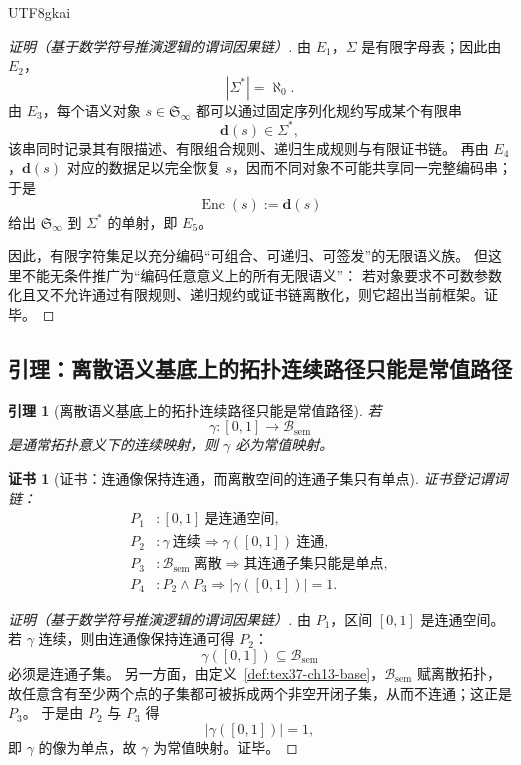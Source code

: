 \documentclass[12pt]{article}
\newtheorem{lemma}{引理}[section]
\newtheorem{Certificate}{证书}[section]
\begin{document}
\begin{CJK*}{UTF8}{gkai}
\begin{proof}[证明（基于数学符号推演逻辑的谓词因果链）]
由 $E_1$，$\Sigma$ 是有限字母表；因此由 $E_2$，
\[
  |\Sigma^\ast|=\aleph_0.
\]
由 $E_3$，每个语义对象 $s\in\mathfrak S_\infty$ 都可以通过固定序列化规约写成某个有限串
\[
  \mathbf d(s)\in \Sigma^\ast,
\]
该串同时记录其有限描述、有限组合规则、递归生成规则与有限证书链。
再由 $E_4$，$\mathbf d(s)$ 对应的数据足以完全恢复 $s$，因而不同对象不可能共享同一完整编码串；
于是
\[
  \operatorname{Enc}(s):=\mathbf d(s)
\]
给出 $\mathfrak S_\infty$ 到 $\Sigma^\ast$ 的单射，即 $E_5$。

因此，有限字符集足以充分编码“可组合、可递归、可签发”的无限语义族。
但这里不能无条件推广为“编码任意意义上的所有无限语义”：
若对象要求不可数参数化且又不允许通过有限规则、递归规约或证书链离散化，则它超出当前框架。证毕。
\end{proof}

\subsection{引理：离散语义基底上的拓扑连续路径只能是常值路径}
\label{subsec:tex37-ch13-const-path}

\begin{lemma}[离散语义基底上的拓扑连续路径只能是常值路径]
\label{lem:tex37-ch13-const-path}
若
\[
  \gamma:[0,1]\to \mathcal B_{\mathrm{sem}}
\]
是通常拓扑意义下的连续映射，则 $\gamma$ 必为常值映射。
\end{lemma}

\begin{Certificate}[证书：连通像保持连通，而离散空间的连通子集只有单点]
\label{cert:tex37-ch13-const-path}
证书登记谓词链：
\[
\begin{aligned}
  P_1 &: [0,1]\ \text{是连通空间},\\
  P_2 &: \gamma\ \text{连续}\Rightarrow \gamma([0,1])\ \text{连通},\\
  P_3 &: \mathcal B_{\mathrm{sem}}\ \text{离散}\Rightarrow \text{其连通子集只能是单点},\\
  P_4 &: P_2\wedge P_3\Rightarrow |\gamma([0,1])|=1.
\end{aligned}
\]
\end{Certificate}

\begin{proof}[证明（基于数学符号推演逻辑的谓词因果链）]
由 $P_1$，区间 $[0,1]$ 是连通空间。
若 $\gamma$ 连续，则由连通像保持连通可得 $P_2$：
\[
  \gamma([0,1])\subseteq \mathcal B_{\mathrm{sem}}
\]
必须是连通子集。
另一方面，由定义~\ref{def:tex37-ch13-base}，$\mathcal B_{\mathrm{sem}}$ 赋离散拓扑，
故任意含有至少两个点的子集都可被拆成两个非空开闭子集，从而不连通；这正是 $P_3$。
于是由 $P_2$ 与 $P_3$ 得
\[
  |\gamma([0,1])|=1,
\]
即 $\gamma$ 的像为单点，故 $\gamma$ 为常值映射。证毕。
\end{proof}


\end{CJK*}
\end{document}
